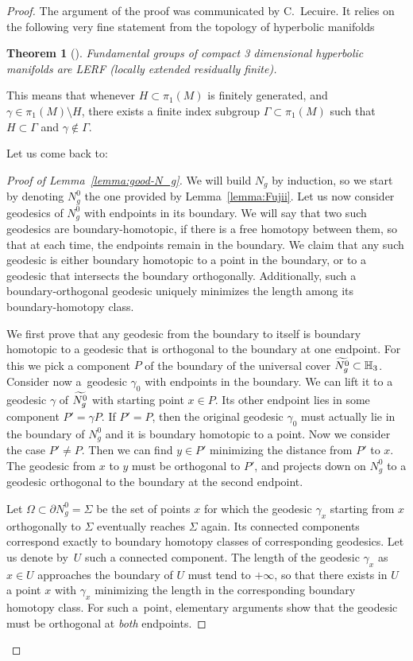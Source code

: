 \documentclass[10pt]{amsart}
\newtheorem{theo}{Theorem}[section]
\theoremstyle{definition}\newtheorem{defi}[theo]{Definition}\newtheorem{rema}[theo]{Remark}\newtheorem{exam}[theo]{Example}\newtheorem{exem}[theo]{Example}\newtheorem{nota}[theo]{Notation}
\newcommand{\Hh}{\mathbb{H}}
\theoremstyle{plain}
\let\oldtilde\tilde
\renewcommand*{\tilde}[1]{\mathchoice{\widetilde{#1}}{\widetilde{#1}}{\oldtilde{#1}}{\oldtilde{#1}}}
\begin{document}
\begin{proof}
The argument of the proof was communicated by C.~Lecuire. It relies on the following very fine statement from the topology of hyperbolic manifolds

\begin{theo}[{\cite[Theorem~9.2]{Agol2012}}]
Fundamental groups of compact 3 dimensional hyperbolic manifolds are LERF (locally extended residually finite).
\end{theo}

This means that whenever $H\subset \pi_1(M)$ is finitely generated, and $\gamma\in \pi_1(M)\setminus H$, there exists a finite index subgroup $\Gamma\subset\pi_1(M)$ such that $H\subset \Gamma$ and $\gamma\notin \Gamma$.

Let us come back to:

\begin{proof}[Proof of Lemma~\ref{lemma:good-N_g}]
We will build $N_g$ by induction, so we start by denoting $N_g^0$ the one provided by Lemma~\ref{lemma:Fujii}. Let us now consider geodesics of $N_g^0$ with endpoints in its boundary. We will say that two such geodesics are boundary-homotopic, if there is a free homotopy between them, so that at each time, the endpoints remain in the boundary. We claim that any such geodesic is either boundary homotopic to a point in the boundary, or to a geodesic that intersects the boundary orthogonally. Additionally, such a boundary-orthogonal geodesic uniquely minimizes the length among its boundary-homotopy class.

We first prove that any geodesic from the boundary to itself is boundary homotopic to a geodesic that is orthogonal to the boundary at one endpoint. For this we pick a component $P$ of the boundary of the universal cover $\tilde{N_g^0}\subset \Hh_3$. Consider now a~geodesic $\gamma_0$ with endpoints in the boundary. We can lift it to a geodesic $\gamma$ of $\tilde{N_g^0}$ with starting point $x\in P$. Its other endpoint lies in some component $P'=\gamma P$. If $P'= P$, then the original geodesic $\gamma_0$ must actually lie in the boundary of $N_g^0$ and it is boundary homotopic to a point. Now we consider the case $P'\neq P$. Then we can find $y\in P'$ minimizing the distance from $P'$ to $x$. The geodesic from $x$ to $y$ must be orthogonal to $P'$, and projects down on $N_g^0$ to a geodesic orthogonal to the boundary at the second endpoint.

Let $\Omega\subset \partial N_g^0 = \Sigma$ be the set of points $x$ for which the geodesic $\gamma_x$ starting from $x$ orthogonally to $\Sigma$ eventually reaches $\Sigma$ again. Its connected components correspond exactly to boundary homotopy classes of corresponding geodesics. Let us denote by~$U$ such a connected component. The length of the geodesic $\gamma_x$ as $x\in U$ approaches the boundary of $U$ must tend to $+\infty$, so that there exists in $U$ a point $x$ with $\gamma_x$ minimizing the length in the corresponding boundary homotopy class. For such a~point, elementary arguments show that the geodesic must be orthogonal at \emph{both} endpoints.


\end{proof}
\end{proof}
\end{document}
